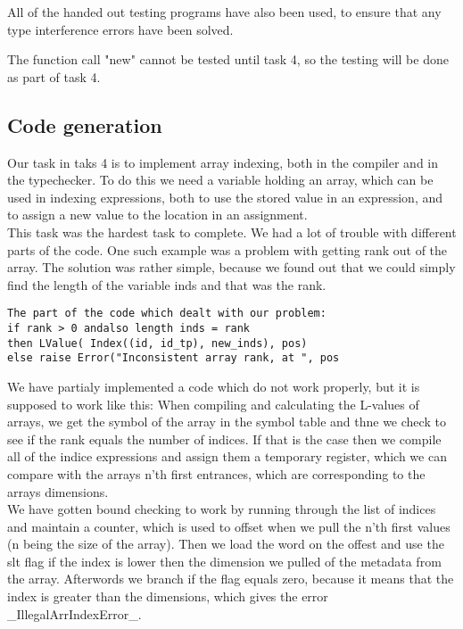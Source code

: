 \documentclass[11pt]{article}
\begin{document}
All of the handed out testing programs have also been used, to ensure that any type interference errors have been solved.

The function call "new" cannot be tested until task 4, so the testing will be done as part of task 4.

\subsection*{Code generation}
Our task in taks 4 is to implement array indexing, both in the compiler and in the typechecker. To do this we need a variable holding an array, which can be used in indexing expressions, both to use the stored value in an expression, and to assign a new value to the location in an assignment.
\\
This task was the hardest task to complete. We had a lot of trouble with different parts of the code. One such example was a problem with getting rank out of the array. The solution was rather simple, because we found out that we could simply find the length of the variable inds and that was the rank.

\begin{lstlisting}
The part of the code which dealt with our problem:
if rank > 0 andalso length inds = rank
then LValue( Index((id, id_tp), new_inds), pos)
else raise Error("Inconsistent array rank, at ", pos
\end{lstlisting}

We have partialy implemented a code which do not work properly, but it is supposed to work like this:
When compiling and calculating the L-values of arrays, we get the symbol of the array in the symbol table and thne we check to see if the rank equals the number of indices. If that is the case then we compile all of the indice expressions and assign them a temporary register, which we can compare with the arrays n'th first entrances, which are corresponding to the arrays dimensions.
\\

We have gotten bound checking to work by running through the list of indices and maintain a counter, which is used to offset when we pull the n'th first values (n being the size of the array). Then we load the word on the offest and use the slt flag if the index is lower then the dimension we pulled of the metadata from the array. Afterwords we branch if the flag equals zero, because it means that the index is greater than the dimensions, which gives the error \_IllegalArrIndexError\_.
\\
\end{document}
